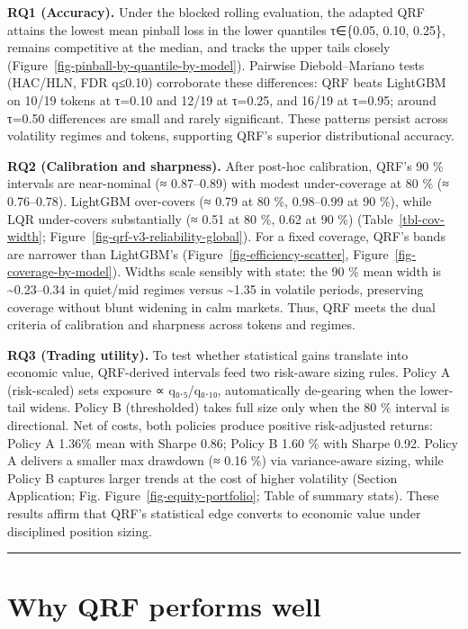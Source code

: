 \documentclass[
  a4paper,
  DIV=11,
  numbers=noendperiod]{scrreprt}
\begin{document}
\textbf{RQ1 (Accuracy).} Under the blocked rolling evaluation, the
adapted QRF attains the lowest mean pinball loss in the lower quantiles
τ∈\{0.05, 0.10, 0.25\}, remains competitive at the median, and tracks
the upper tails closely (Figure~\ref{fig-pinball-by-quantile-by-model}).
Pairwise Diebold--Mariano tests (HAC/HLN, FDR q≤0.10) corroborate these
differences: QRF beats LightGBM on 10/19 tokens at τ=0.10 and 12/19 at
τ=0.25, and 16/19 at τ=0.95; around τ=0.50 differences are small and
rarely significant. These patterns persist across volatility regimes and
tokens, supporting QRF's superior distributional accuracy.

\textbf{RQ2 (Calibration and sharpness).} After post-hoc calibration,
QRF's 90 \% intervals are near-nominal (≈ 0.87--0.89) with modest
under-coverage at 80 \% (≈ 0.76--0.78). LightGBM over-covers (≈ 0.79 at
80 \%, 0.98--0.99 at 90 \%), while LQR under-covers substantially (≈
0.51 at 80 \%, 0.62 at 90 \%) (Table~\ref{tbl-cov-width};
Figure~\ref{fig-qrf-v3-reliability-global}). For a fixed coverage, QRF's
bands are narrower than LightGBM's (Figure~\ref{fig-efficiency-scatter},
Figure~\ref{fig-coverage-by-model}). Widths scale sensibly with state:
the 90 \% mean width is \textasciitilde0.23--0.34 in quiet/mid regimes
versus \textasciitilde1.35 in volatile periods, preserving coverage
without blunt widening in calm markets. Thus, QRF meets the dual
criteria of calibration and sharpness across tokens and regimes.

\textbf{RQ3 (Trading utility).} To test whether statistical gains
translate into economic value, QRF-derived intervals feed two risk-aware
sizing rules. Policy A (risk-scaled) sets exposure ∝
q₀.₅/\textbar q₀.₁₀\textbar, automatically de-gearing when the
lower-tail widens. Policy B (thresholded) takes full size only when the
80 \% interval is directional. Net of costs, both policies produce
positive risk-adjusted returns: Policy A 1.36\% mean with Sharpe 0.86;
Policy B 1.60 \% with Sharpe 0.92. Policy A delivers a smaller max
drawdown (≈ 0.16 \%) via variance-aware sizing, while Policy B captures
larger trends at the cost of higher volatility (Section Application;
Fig. Figure~\ref{fig-equity-portfolio}; Table of summary stats). These
results affirm that QRF's statistical edge converts to economic value
under disciplined position sizing.

\begin{center}\rule{0.5\linewidth}{0.5pt}\end{center}

\section{Why QRF performs well}\label{why-qrf-performs-well}
\end{document}
